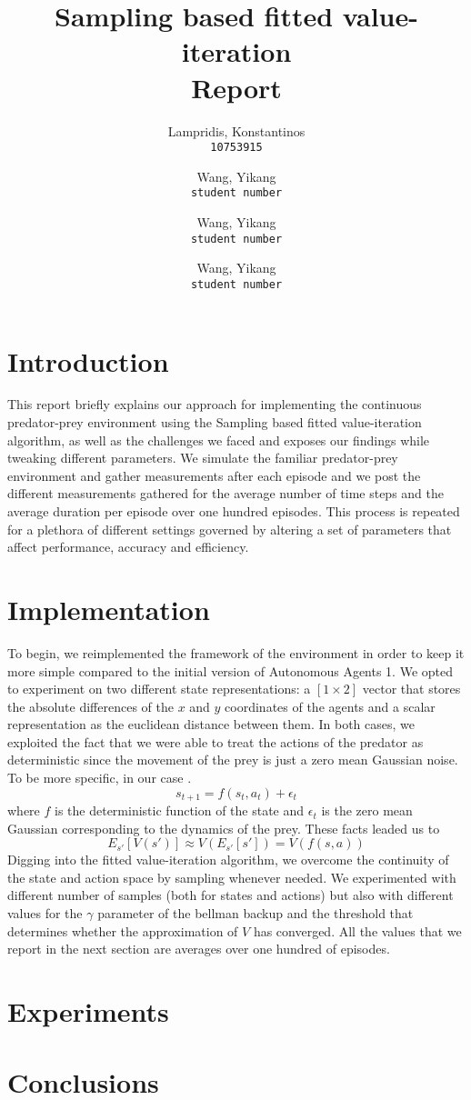 \documentclass{article}
\title{Sampling based fitted value-iteration\\Report}
\author{
  Lampridis, Konstantinos\\
  \texttt{10753915}
  \and
  Wang, Yikang\\
  \texttt{student number}
  \and
  Wang, Yikang\\
  \texttt{student number}
  \and
  Wang, Yikang\\
  \texttt{student number}
}
\begin{document}
  \maketitle


\section{Introduction}

This report briefly explains our approach for implementing the continuous predator-prey environment using the Sampling based fitted value-iteration algorithm, as well as the challenges we faced and exposes our findings while tweaking different parameters. We simulate the familiar predator-prey environment and gather measurements after each episode and we post the different measurements gathered for the average number of time steps and the average duration per episode over one hundred episodes. This process is repeated for a plethora of different settings governed by altering a set of parameters that affect performance, accuracy and efficiency.


\section{Implementation}

To begin, we reimplemented the framework of the environment in order to keep it more simple compared to the initial version of Autonomous Agents 1. We opted to experiment on two different state representations: a $[1\times2]$ vector that stores the absolute differences of the $x$ and $y$ coordinates of the agents and a scalar representation as the euclidean distance between them. In both cases, we exploited the fact that we were able to treat the actions of the predator as deterministic since the movement of the prey is just a zero mean Gaussian noise. To be more specific, in our case \cite{hello}.
\[s_{t+1} = f(s_t, a_t) + \epsilon_t\]
where $f$ is the deterministic function of the state and $\epsilon_t$ is the zero mean Gaussian corresponding to the dynamics of the prey. These facts leaded us to
\[E_{s'}[V(s')] \approx V(E_{s'}[s']) = V(f(s,a))\]
Digging into the fitted value-iteration algorithm, we overcome the continuity of the state and action space by sampling whenever needed. We experimented with different number of samples (both for states and actions) but also with different values for the $\gamma$ parameter of the bellman backup and the threshold that determines whether the approximation of $V$ has converged. All the values that we report in the next section are averages over one hundred of episodes.

\section{Experiments}


\section{Conclusions}




\end{document}
